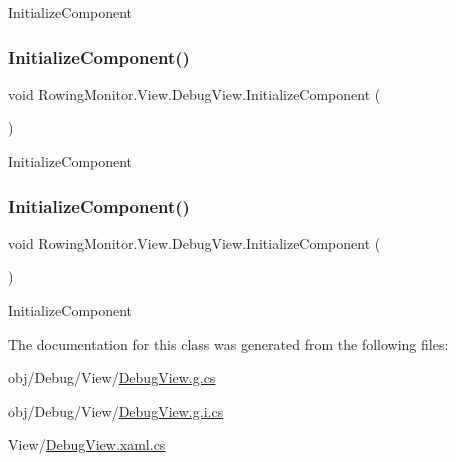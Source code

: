 Initialize\+Component 

\mbox{\label{class_rowing_monitor_1_1_view_1_1_debug_view_a3fd59a2688428b98569c4fc149657a70}} 
\subsubsection{\texorpdfstring{Initialize\+Component()}{InitializeComponent()}\hspace{0.1cm}{\footnotesize\ttfamily [3/4]}}
{\footnotesize\ttfamily void Rowing\+Monitor.\+View.\+Debug\+View.\+Initialize\+Component (\begin{DoxyParamCaption}{ }\end{DoxyParamCaption})}



Initialize\+Component 

\mbox{\label{class_rowing_monitor_1_1_view_1_1_debug_view_a3fd59a2688428b98569c4fc149657a70}} 
\subsubsection{\texorpdfstring{Initialize\+Component()}{InitializeComponent()}\hspace{0.1cm}{\footnotesize\ttfamily [4/4]}}
{\footnotesize\ttfamily void Rowing\+Monitor.\+View.\+Debug\+View.\+Initialize\+Component (\begin{DoxyParamCaption}{ }\end{DoxyParamCaption})}



Initialize\+Component 



The documentation for this class was generated from the following files\+:\begin{DoxyCompactItemize}
\item 
obj/\+Debug/\+View/\hyperlink{_debug_2_view_2_debug_view_8g_8cs}{Debug\+View.\+g.\+cs}\item 
obj/\+Debug/\+View/\hyperlink{_debug_2_view_2_debug_view_8g_8i_8cs}{Debug\+View.\+g.\+i.\+cs}\item 
View/\hyperlink{_debug_view_8xaml_8cs}{Debug\+View.\+xaml.\+cs}\end{DoxyCompactItemize}
